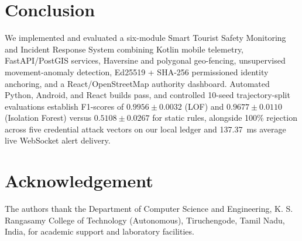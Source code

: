 \documentclass[conference]{IEEEtran}
\begin{document}
\section{Conclusion}
We implemented and evaluated a six-module Smart Tourist Safety Monitoring and Incident Response System combining Kotlin mobile telemetry, FastAPI/PostGIS services, Haversine and polygonal geo-fencing, unsupervised movement-anomaly detection, Ed25519 + SHA-256 permissioned identity anchoring, and a React/OpenStreetMap authority dashboard. Automated Python, Android, and React builds pass, and controlled 10-seed trajectory-split evaluations establish F1-scores of $0.9956 \pm 0.0032$ (LOF) and $0.9677 \pm 0.0110$ (Isolation Forest) versus $0.5108 \pm 0.0267$ for static rules, alongside 100\% rejection across five credential attack vectors on our local ledger and 137.37~ms average live WebSocket alert delivery.

\section*{Acknowledgement}
The authors thank the Department of Computer Science and Engineering, K. S. Rangasamy College of Technology (Autonomous), Tiruchengode, Tamil Nadu, India, for academic support and laboratory facilities.
\end{document}
